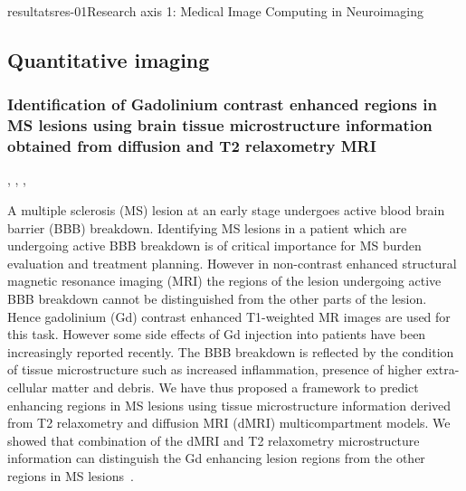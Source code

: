 \documentclass{ra2018}
\begin{document}
\begin{module}{resultats}{res-01}{Research axis 1: Medical Image Computing in Neuroimaging}
\subsection{Quantitative imaging}
\subsubsection{Identification of Gadolinium contrast enhanced regions in MS lesions using brain tissue microstructure information obtained from diffusion and T2 relaxometry MRI}
\begin{participants}
      ,
      , 
      ,
\end{participants}
A multiple sclerosis (MS) lesion at an early stage undergoes active blood brain barrier (BBB) breakdown. Identifying MS lesions in a patient which are undergoing active BBB breakdown is of critical importance for MS burden evaluation and treatment planning. However in non-contrast enhanced structural magnetic resonance imaging (MRI) the regions of the lesion undergoing active BBB breakdown cannot be distinguished from the other parts of the lesion. Hence gadolinium (Gd) contrast enhanced T1-weighted MR images are used for this task. However some side effects of Gd injection into patients have been increasingly reported recently. The BBB breakdown is reflected by the condition of tissue microstructure such as increased inflammation, presence of higher extra-cellular matter and debris. We have thus proposed a framework to predict enhancing regions in MS lesions using tissue microstructure information derived from T2 relaxometry and diffusion MRI (dMRI) multicompartment models. We showed that combination of the dMRI and T2 relaxometry microstructure information can distinguish the Gd enhancing lesion regions from the other regions in MS lesions~\cite{chatterjee:hal-01830532}.


\end{module}
\end{document}

